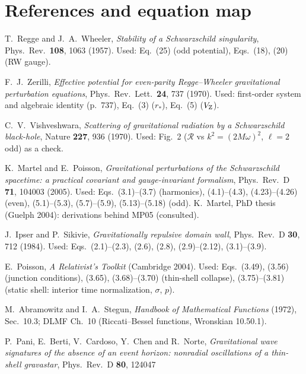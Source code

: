 \documentclass[11pt,a4paper]{article}
\numberwithin{equation}{section}
\begin{document}
\section{References and equation map}\label{sec:refs}
\begin{description}\small
\item[{[RW57]}] T.~Regge and J.~A.~Wheeler, \emph{Stability of a Schwarzschild singularity}, Phys.\ Rev.\ \textbf{108},
  1063 (1957). Used: Eq.~(25) (odd potential), Eqs.~(18), (20) (RW gauge).
\item[{[Z70]}] F.~J.~Zerilli, \emph{Effective potential for even-parity Regge--Wheeler gravitational perturbation
  equations}, Phys.\ Rev.\ Lett.\ \textbf{24}, 737 (1970). Used: first-order system and algebraic identity
  (p.~737), Eq.~(3) ($r_*$), Eq.~(5) ($V_{\rm Z}$).
\item[{[V70]}] C.~V.~Vishveshwara, \emph{Scattering of gravitational radiation by a Schwarzschild black-hole},
  Nature \textbf{227}, 936 (1970). Used: Fig.~2 ($\mathcal R$ vs $k^2=(2M\omega)^2$, $\ell=2$ odd) as a check.
\item[{[MP05]}] K.~Martel and E.~Poisson, \emph{Gravitational perturbations of the Schwarzschild spacetime: a practical
  covariant and gauge-invariant formalism}, Phys.\ Rev.\ D \textbf{71}, 104003 (2005). Used: Eqs.~(3.1)--(3.7)
  (harmonics), (4.1)--(4.3), (4.23)--(4.26) (even), (5.1)--(5.3), (5.7)--(5.9), (5.13)--(5.18) (odd).
  K.~Martel, PhD thesis (Guelph 2004): derivations behind MP05 (consulted).
\item[{[IS84]}] J.~Ipser and P.~Sikivie, \emph{Gravitationally repulsive domain wall}, Phys.\ Rev.\ D \textbf{30}, 712
  (1984). Used: Eqs.~(2.1)--(2.3), (2.6), (2.8), (2.9)--(2.12), (3.1)--(3.9).
\item[{[P04]}] E.~Poisson, \emph{A Relativist's Toolkit} (Cambridge 2004). Used: Eqs.~(3.49), (3.56) (junction
  conditions), (3.65), (3.68)--(3.70) (thin-shell collapse), (3.75)--(3.81) (static shell: interior time
  normalization, $\sigma$, $p$).
\item[{[AS72]}] M.~Abramowitz and I.~A.~Stegun, \emph{Handbook of Mathematical Functions} (1972), Sec.~10.3; DLMF
  Ch.~10 (Riccati--Bessel functions, Wronskian 10.50.1).
\item[{[PBCCN09]}] P.~Pani, E.~Berti, V.~Cardoso, Y.~Chen and R.~Norte, \emph{Gravitational wave signatures of the absence
  of an event horizon: nonradial oscillations of a thin-shell gravastar}, Phys.\ Rev.\ D \textbf{80}, 124047

\end{description}
\end{document}

